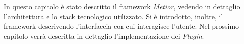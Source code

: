 In questo capitolo è stato descritto il framework \emph{Metior}, vedendo in dettaglio l'architettura e lo stack tecnologico utilizzato.
Si è introdotto, inoltre, il framework descrivendo l'interfaccia con cui interagisce l'utente.
Nel prossimo capitolo verrà descritta in dettaglio l'implementazione dei \emph{Plugin}.
